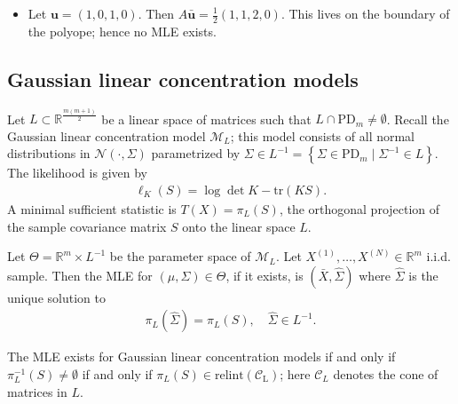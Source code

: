 \begin{eg}
\begin{itemize}
    \item Let \( \mathbf{u} = (1,0,1,0) \). Then \( A\bar{\mathbf{u}} = \frac{1}{2}(1,1,2,0) \). This lives on the boundary of the polyope; hence no MLE exists.
  \end{itemize}
\end{eg}

\subsection{Gaussian linear concentration models}

Let \( L \subset \mathbb{R}^{\frac{m(m+1)}{2}} \) be a linear space of matrices such that \( L \cap \mathrm{PD}_m \neq \emptyset \).
Recall the Gaussian linear concentration model \( \mathcal{M}_L \); this model consists of all normal distributions in \( \mathcal{N}(\cdot, \Sigma) \)  parametrized by \( \Sigma \in L^{-1} = \left\{ \Sigma \in \mathrm{PD}_m \mid \Sigma^{-1} \in L \right\} \). The likelihood is given by 
\begin{align*}
  \ell_K(S) = \log \det K - \mathrm{tr}(KS).
\end{align*}
A minimal sufficient statistic is \( T(X) = \pi_L(S) \), the orthogonal projection of the sample covariance matrix \( S \) onto the linear space \( L \).

\begin{thm}
  Let \( \Theta = \mathbb{R}^m \times L^{-1} \) be the parameter space of \( \mathcal{M}_L \). Let \( X^{(1)}, \dots, X^{(N)} \in \mathbb{R}^m \) i.i.d. sample. Then the MLE for \( (\mu, \Sigma) \in \Theta \), if it exists, is \( (\bar X, \hat \Sigma) \) where \( \hat \Sigma \) is the unique solution to 
  \begin{align*}
    \pi_L(\hat \Sigma) = \pi_L(S), \quad \hat \Sigma \in L^{-1}.
  \end{align*}
\end{thm}

\begin{prop}
  The MLE exists for Gaussian linear concentration models if and only if \( \pi^{-1}_L(S) \neq \emptyset   \) if and only if \( \pi_L(S) \in \mathrm{relint(\mathcal{C}_L)} \); here \( \mathcal{C}_L \) denotes the cone of matrices in \( L \).
\end{prop}

